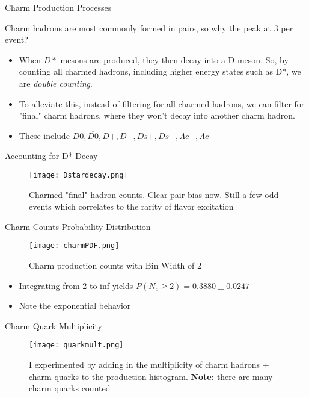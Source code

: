 \documentclass[10pt]{beamer}
\begin{document}
\begin{frame}{Charm Production Processes}

Charm hadrons are most commonly formed in pairs, so why the peak at 3 per event? 
\begin{itemize}
    \item When $D*$ mesons are produced, they then decay into a D meson. So, by counting all charmed hadrons, including higher energy states such as D*, we are \textit{double counting}.

    \item To alleviate this, instead of filtering for all charmed hadrons, we can filter for "final" charm hadrons, where they won't decay into another charm hadron. 

    \item These include $D0,\overline{D0}, D+, D-, Ds+, Ds-, \Lambda c+, \Lambda c-$

\end{itemize}
\end{frame}

\begin{frame}{Accounting for D* Decay}

\begin{figure}
    \centering
    \texttt{[image: Dstardecay.png]}
    \caption{Charmed "final" hadron counts. Clear pair bias now. Still a few odd events which correlates to the rarity of flavor excitation}
    \label{fig:D* Decay}
\end{figure}
\end{frame}

\begin{frame}{Charm Counts Probability Distribution}

\begin{figure}
    \centering
    \texttt{[image: charmPDF.png]}
    \caption{Charm production counts with Bin Width of 2 }
    \label{fig:PDF}
\end{figure}
\begin{itemize}
    \item Integrating from 2 to inf yields $P(N_c\geq2) = 0.3880 \pm 0.0247$ 

    \item Note the exponential behavior
\end{itemize}
\end{frame}

\begin{frame}{Charm Quark Multiplicity}

\begin{figure}
    \centering
    \texttt{[image: quarkmult.png]}
    \caption{I experimented by adding in the multiplicity of charm hadrons + charm quarks to the production histogram. \textbf{Note:} there are many charm quarks counted}
    \label{fig:quark mult}
\end{figure}
    
\end{frame}
\end{document}
